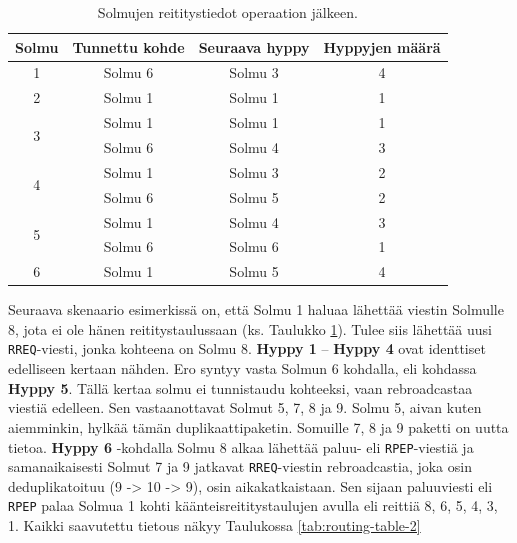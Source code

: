 \documentclass[finnish,utf8,nonumbib,palatino]{KokkolaRaportti}
\begin{document}
\begin{table}[htbp]
\centering
\begin{tabular}{cccc}
\toprule
\textbf{Solmu} & \textbf{Tunnettu kohde} & \textbf{Seuraava hyppy} & \textbf{Hyppyjen määrä} \\
\midrule
1 & Solmu 6 & Solmu 3 & 4 \\
\midrule
2 & Solmu 1 & Solmu 1 & 1 \\
\midrule
\multirow{2}{*}{3} & Solmu 1 & Solmu 1 & 1 \\
                   & Solmu 6 & Solmu 4 & 3 \\
\midrule
\multirow{2}{*}{4} & Solmu 1 & Solmu 3 & 2 \\
                   & Solmu 6 & Solmu 5 & 2 \\
\midrule
\multirow{2}{*}{5} & Solmu 1 & Solmu 4 & 3 \\
                   & Solmu 6 & Solmu 6 & 1 \\
\midrule
6 & Solmu 1 & Solmu 5 & 4 \\
\bottomrule
\end{tabular}
\caption{Solmujen reititystiedot operaation jälkeen.}
\label{tab:routing-table-1}
\end{table}

Seuraava skenaario esimerkissä on, että Solmu 1 haluaa lähettää viestin Solmulle 8, jota ei ole hänen reititystaulussaan (ks. Taulukko \ref{tab:routing-table-1}). Tulee siis lähettää uusi \texttt{RREQ}-viesti, jonka kohteena on Solmu 8. \textbf{Hyppy 1} -- \textbf{Hyppy 4} ovat identtiset edelliseen kertaan nähden. Ero syntyy vasta Solmun 6 kohdalla, eli kohdassa \textbf{Hyppy 5}. Tällä kertaa solmu ei tunnistaudu kohteeksi, vaan rebroadcastaa viestiä edelleen. Sen vastaanottavat Solmut 5, 7, 8 ja 9.  Solmu 5, aivan kuten aiemminkin, hylkää tämän duplikaattipaketin. Somuille 7, 8 ja 9 paketti on uutta tietoa. \textbf{Hyppy 6} -kohdalla Solmu 8 alkaa lähettää paluu- eli \texttt{RPEP}-viestiä ja samanaikaisesti Solmut 7 ja 9 jatkavat \texttt{RREQ}-viestin rebroadcastia, joka osin deduplikatoituu (9 -> 10 -> 9), osin aikakatkaistaan. Sen sijaan paluuviesti eli \texttt{RPEP} palaa Solmua 1 kohti käänteisreititystaulujen avulla eli reittiä 8, 6, 5, 4, 3, 1. Kaikki saavutettu tietous näkyy Taulukossa \ref{tab:routing-table-2}
\end{document}
